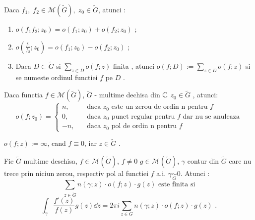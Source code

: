 \begin{theorem}
    Daca $f_1,\; f_2 \in \mathcal{M}(\widetilde{G}), \; z_0 \in \widetilde{G}$, atunci :
    \begin{enumerate}
        \item $ o (f_1 f_2; z_0) = o(f_1; z_0) + o(f_2; z_0)$ ;
        \item $\displaystyle o \left( \frac{f_1}{f_2} ; z_0\right) = o(f_1;z_0) - o(f_2;z_0)$ ;
        \item Daca $D \subset \widetilde{G}$ si $\displaystyle \sum_{z \in D} o(f;z)$ finita ,
            atunci $\displaystyle o(f;D) := \sum_{z \in D} o(f;z) $  si se numeste ordinul
            functiei $f$ pe $D$ .
    \end{enumerate}

    Daca functia $f \in \mathcal{M}(\widetilde{G})$, $\widetilde{G}$ - multime dechisa din $\mathbb{C}$
    $z_0 \in \widetilde{G}$ , atunci:
    \[
        o(f;z_0) =
            \left \{
            \begin{aligned}
                 n \text{,} && \text{ daca } z_0 \text{ este un zerou de ordin n pentru } f \\
                 0 \text{,} &&\text{ daca } z_0 \text{ punct regular pentru } f \text { dar nu se anuleaza}\\
                -n \text{,} &&\text{ daca } z_0 \text{ pol de ordin n pentru } f
            \end{aligned}
           \right.
    \]
\end{theorem}

\begin{definition}
    $o(f;z) := \infty$, cand $f \equiv 0$, iar $z \in \widetilde{G}$ .
\end{definition}

\begin{theorem}
    Fie $\widetilde{G}$ multime deschisa, $f \in \mathcal{M}(\widetilde{G})$, $f \neq 0$
    $g \in \mathcal{M}(\widetilde{G})$, $\gamma$ contur din $\widetilde{G}$ care nu trece
    prin niciun zerou, respectiv pol al functiei $f$ a.i. $\gamma \underset{G}{\sim} 0$.
    Atunci :
    \[
        \sum_{z \in \widetilde{G}} n(\gamma;z)\cdot o(f;z) \cdot g(z)  \text{ este finita si}
    \]
    \[
        \int_{\gamma} \frac{f'(z)}{f(z)} g(z) \dd z = 2 \pi i \sum_{z \in G} n(\gamma;z) \cdot o(f;z) \cdot g(z) \text{  .}
    \]
\end{theorem}